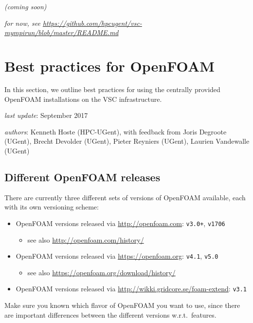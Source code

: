 \textit{(coming soon)}

\textit{for now, see {\small\url{https://github.com/hpcugent/vsc-mympirun/blob/master/README.md}}}


\section{Best practices for OpenFOAM}
\label{sec:best-practices-openfoam}

In this section, we outline best practices for using the centrally provided OpenFOAM installations
on the VSC \hpc infrastructure.

\textit{last update}: September 2017

\textit{authors}: Kenneth Hoste (HPC-UGent), with feedback from Joris Degroote (UGent), Brecht Devolder (UGent),
                  Pieter Reyniers (UGent), Laurien Vandewalle (UGent)


\subsection{Different OpenFOAM releases}
\label{sec:best-practices-openfoam-releases}

There are currently three different sets of versions of OpenFOAM available, each with its own versioning scheme:

\begin{itemize}
    \item OpenFOAM versions released via \url{http://openfoam.com}: {\small\texttt{v3.0+}}, {\small\texttt{v1706}}
    \begin{itemize}
        \item see also \url{http://openfoam.com/history/}
    \end{itemize}
    \item OpenFOAM versions released via \url{https://openfoam.org}: {\small\texttt{v4.1}}, {\small\texttt{v5.0}}
    \begin{itemize}
        \item see also \url{https://openfoam.org/download/history/}
    \end{itemize}
    \item OpenFOAM versions released via \url{http://wikki.gridcore.se/foam-extend}: {\small\texttt{v3.1}}
\end{itemize}

Make sure you known which flavor of OpenFOAM you want to use, since there are important differences between
the different versions w.r.t.\ features.

